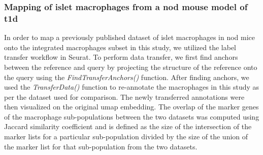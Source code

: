 \subsubsection{\large Mapping of islet macrophages from a \gls{nod} mouse model of \gls{t1d}}
\label{subsubsec:met_chp2_labeltransfer}
In order to map a previously published dataset of islet macrophages in \gls{nod} mice \textbf{\cite{zakharov_single-cell_2020}} onto the integrated macrophages subset in this study, we utilized the label transfer workflow in Seurat. To perform data transfer, we first find anchors between the reference and query by projecting the  structure of the reference onto the query using the \textit{FindTransferAnchors()} function. After finding anchors, we used the \textit{TransferData()} function to re-annotate the macrophages in this study as per the dataset used for comparison. The newly transferred annotations were then visualized on the original \gls{umap} embedding. The overlap of the marker genes of the macrophage sub-populations between the two datasets was computed using Jaccard similarity coefficient and is defined as the size of the intersection of the marker lists for a particular sub-population divided by the size of the union of the marker list for that sub-population from the two datasets.




